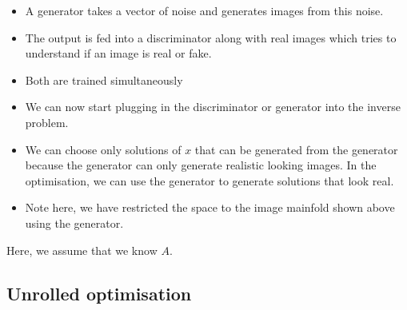 \documentclass[11pt]{article}
\begin{document}
\begin{minipage}[l]{.5\linewidth}
    \begin{figure}[H]
        \centering
    \end{figure}    
\end{minipage}\hfill
\begin{minipage}[r]{.48\linewidth}
    \begin{itemize}
        \item A generator takes a vector of noise and generates images from this noise.
        \item The output is fed into a discriminator along with real images which tries to understand if an image is real or fake.
        \item Both are trained simultaneously 
    \end{itemize}
\end{minipage}

\begin{minipage}[l]{.5\linewidth}
    \begin{figure}[H]
        \centering
    \end{figure}    
\end{minipage}\hfill
\begin{minipage}[r]{.48\linewidth}
    \begin{itemize}
        \item We can now start plugging in the discriminator or generator into the inverse problem.
        \item We can choose only solutions of $x$ that can be generated from the generator because the generator can only generate realistic looking images. In the optimisation, we can use the generator to generate solutions that look real.
        \item Note here, we have restricted the space to the image mainfold shown above using the generator.
    \end{itemize}
\end{minipage}

Here, we assume that we know $A$.

\subsection{Unrolled optimisation}
\end{document}
